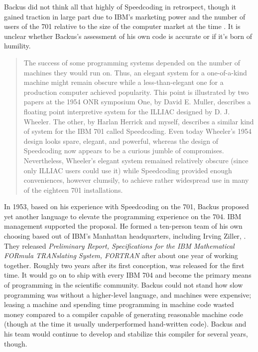 Backus did not think all that highly of Speedcoding in retrospect, though it
gained traction in large part due to IBM's marketing power and the number of
users of the 701 relative to the size of the computer market at the time
\cite{Backus_1980_Programming_in_America_in_1950s}. It is unclear whether
Backus's assessment of his own code is accurate or if it's born of humility.

\begin{quotation}
	The success of some programming systems depended on the number of machines
	they would run on. Thus, an elegant system for a one-of-a-kind machine might
	remain obscure while a less-than-elegant one for a production
	computer achieved popularity.
	This point is illustrated by two papers at the 1954 ONR symposium
	One, by David E. Muller, describes a floating point interpretive system for
	the ILLIAC designed by D. J. Wheeler. The other, by Harlan Herrick and myself,
	describes a similar kind of system for the IBM 701 called Speedcoding. Even
	today Wheeler's 1954 design looks spare, elegant, and powerful, whereas the
	design of Speedcoding now appears to be a curious jumble of compromises.
	Nevertheless, Wheeler's elegant system remained relatively obscure (since only
	ILLIAC users could use it) while Speedcoding provided enough conveniences,
	however clumsily, to achieve rather widespread use in many of the eighteen 701
	installations.
\end{quotation}

In 1953, based on his experience with Speedcoding on the 701, Backus proposed
yet another language to elevate the programming experience on the 704. IBM
management supported the proposal. He formed a ten-person team of his own
choosing based out of IBM's Manhattan headquarters, including Irving Ziller,
. They released \textit{Preliminary Report,
	Specifications for the IBM Mathematical FORmula TRANslating System,
	FORTRAN}\cite{IBM_1954_FORTRAN_Specifications} after about one year of working
together. Roughly two years after its first conception, \FTN{} was released for
the first time. It would go on to ship with every IBM 704 and become the
primary means of programming in the scientific community. Backus could not
stand how slow programming was without a higher-level language, and machines
were expensive; leasing a machine and spending time programming in machine code
wasted money compared to a compiler capable of generating reasonable machine
code (though at the time it usually underperformed hand-written code). Backus
and his team would continue to develop and stabilize this compiler for several
years, though.


